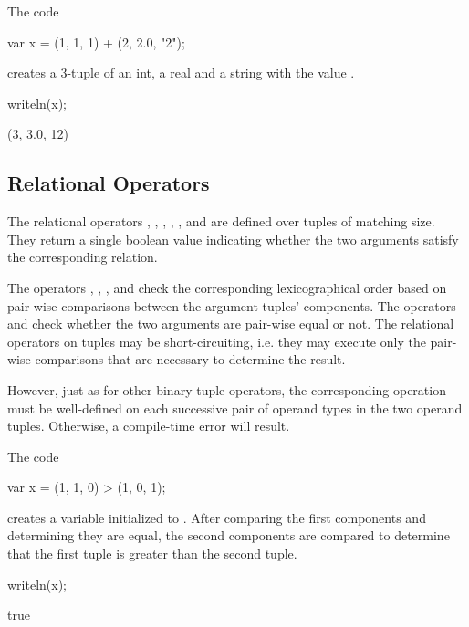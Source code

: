 \begin{example}
\begin{chapelpre}
\end{chapelpre}
The code
\begin{chapel}
var x = (1, 1, 1) + (2, 2.0, "2");
\end{chapel}
creates a 3-tuple of an int, a real and a string with the value .
\begin{chapelpost}
writeln(x);
\end{chapelpost}
\begin{chapeloutput}
(3, 3.0, 12)
\end{chapeloutput}
\end{example}


\subsection{Relational Operators}
\label{Tuple_Relational_Operators}


The relational operators \chpl{\>}, \chpl{\>\=}, \chpl{\<}, \chpl{\<\=},
\chpl{\=\=}, and \chpl{\!\=} are defined over tuples of matching size.
They return a single boolean value indicating whether the two
arguments satisfy the corresponding relation.

The operators \chpl{\>}, \chpl{\>\=}, \chpl{\<}, and \chpl{\<\=}
check the corresponding lexicographical order
based on pair-wise comparisons between the argument tuples' components.
The operators \chpl{\=\=} and \chpl{\!\=} check whether
the two arguments are pair-wise equal or not.
The relational operators on tuples may be short-circuiting, i.e.
they may execute only the pair-wise comparisons that are necessary
to determine the result.

However, just as for other binary tuple operators, the corresponding operation
must be well-defined on each successive pair of operand types in the two operand
tuples.  Otherwise, a compile-time error will result.

\begin{example}
\begin{chapelpre}
\end{chapelpre}
The code
\begin{chapel}
var x = (1, 1, 0) > (1, 0, 1);
\end{chapel}
creates a variable initialized to .  After comparing the
first components and determining they are equal, the second components
are compared to determine that the first tuple is greater than the
second tuple.
\begin{chapelpost}
writeln(x);
\end{chapelpost}
\begin{chapeloutput}
true
\end{chapeloutput}
\end{example}

